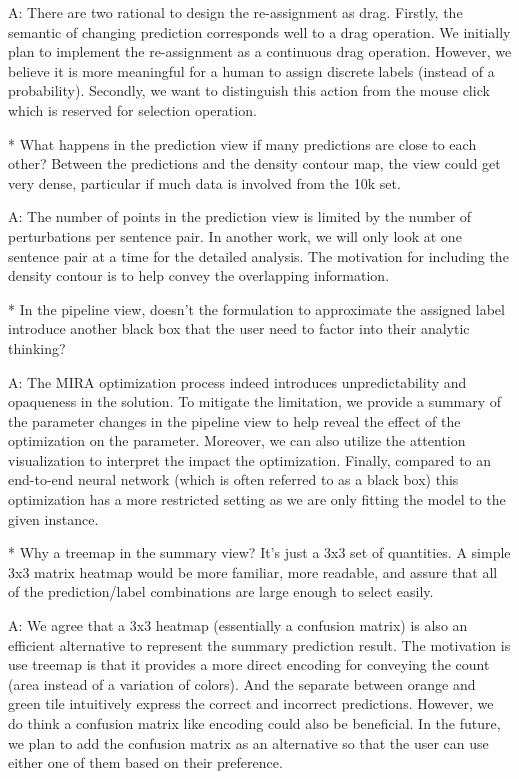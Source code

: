 A: There are two rational to design the re-assignment as drag. Firstly, the semantic of changing prediction corresponds well to a drag operation. We initially plan to implement the re-assignment as a continuous drag operation. However, we believe it is more meaningful for a human to assign discrete labels (instead of a probability). Secondly, we want to distinguish this action from the mouse click which is reserved for selection operation.

* What happens in the prediction view if many predictions are close to each other? Between the predictions and the density contour map, the view could get very dense, particular if much data is involved from the 10k set.

A: The number of points in the prediction view is limited by the number of perturbations per sentence pair. In another work, we will only look at one sentence pair at a time for the detailed analysis. The motivation for including the density contour is to help convey the overlapping information.

* In the pipeline view, doesn't the formulation to approximate the assigned label introduce another black box that the user need to factor into their analytic thinking?

A: The MIRA optimization process indeed introduces unpredictability and opaqueness in the solution. To mitigate the limitation, we provide a summary of the parameter changes in the pipeline view to help reveal the effect of the optimization on the parameter. Moreover, we can also utilize the attention visualization to interpret the impact the optimization. Finally, compared to an end-to-end neural network (which is often referred to as a black box) this optimization has a more restricted setting as we are only fitting the model to the given instance.


* Why a treemap in the summary view? It's just a 3x3 set of quantities. A simple 3x3 matrix heatmap would be more familiar, more readable, and assure that all of the prediction/label combinations are large enough to select easily.

A: We agree that a 3x3 heatmap (essentially a confusion matrix) is also an efficient alternative to represent the summary prediction result. The motivation is use treemap is that it provides a more direct encoding for conveying the count (area instead of a variation of colors). And the separate between orange and green tile intuitively express the correct and incorrect predictions. However, we do think a confusion matrix like encoding could also be beneficial. In the future, we plan to add the confusion matrix as an alternative so that the user can use either one of them based on their preference.

